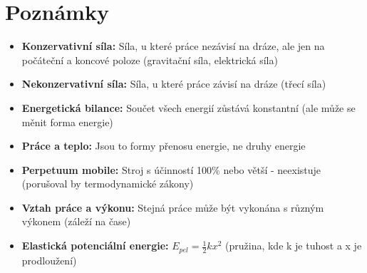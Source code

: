 \documentclass[11pt,a4paper]{article}
\begin{document}
\section*{Poznámky}

\begin{itemize}
\item \textbf{Konzervativní síla:} Síla, u které práce nezávisí na dráze, ale jen na počáteční a koncové poloze (gravitační síla, elektrická síla)
\item \textbf{Nekonzervativní síla:} Síla, u které práce závisí na dráze (třecí síla)
\item \textbf{Energetická bilance:} Součet všech energií zůstává konstantní (ale může se měnit forma energie)
\item \textbf{Práce a teplo:} Jsou to formy přenosu energie, ne druhy energie
\item \textbf{Perpetuum mobile:} Stroj s účinností 100\% nebo větší - neexistuje (porušoval by termodynamické zákony)
\item \textbf{Vztah práce a výkonu:} Stejná práce může být vykonána s různým výkonem (záleží na čase)
\item \textbf{Elastická potenciální energie:} $E_{pel} = \frac{1}{2}kx^2$ (pružina, kde k je tuhost a x je prodloužení)
\end{itemize}
\end{document}
